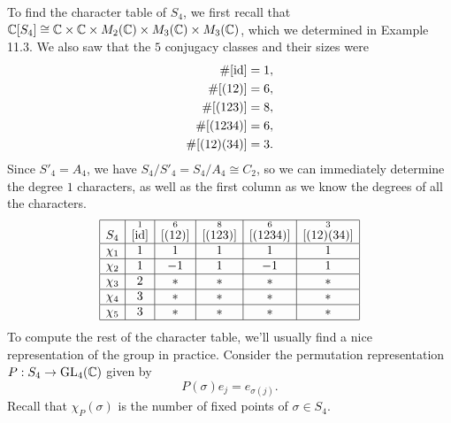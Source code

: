 \begin{exmp}{}
    To find the character table of $S_4$, we first recall that 
    $\mathbb{C}[S_4] \cong \mathbb{C} \times \mathbb{C} \times M_2(\mathbb{C}) \times M_3(\mathbb{C}) \times M_3(\mathbb{C})$, 
    which we determined in Example 11.3. We also saw that the $5$ conjugacy 
    classes and their sizes were 
    \begin{align*} 
        \#[\operatorname{id}] &= 1, \\ 
        \#[(12)] &= 6, \\
        \#[(123)] &= 8, \\
        \#[(1234)] &= 6, \\
        \#[(12)(34)] &= 3. 
    \end{align*}
    Since $S'_4 = A_4$, we have $S_4/S'_4 = S_4/A_4 \cong C_2$, so we can immediately 
    determine the degree $1$ characters, as well as the first column as we 
    know the degrees of all the characters. 
    \begin{align*}
        \begin{array}{|c|c|c|c|c|c|}
            \hline
            S_4    & \overset{1}{[\operatorname{id}]} & \overset{6}{[(12)]} & \overset{8}{[(123)]} & \overset{6}{[(1234)]} & \overset{3}{[(12)(34)]} \\ \hline
            \chi_1 & 1                  & 1                   & 1                    & 1                     & 1                       \\ \hline
            \chi_2 & 1                  & -1                  & 1                    & -1                    & 1                       \\ \hline
            \chi_3 & 2                  & *                   & *                    & *                     & *                       \\ \hline
            \chi_4 & 3                  & *                   & *                    & *                     & *                       \\ \hline
            \chi_5 & 3                  & *                   & *                    & *                     & *                       \\ \hline
        \end{array} 
    \end{align*}
    To compute the rest of the character table, we'll usually find a nice 
    representation of the group in practice. Consider the permutation representation
    $P : S_4 \to \operatorname{GL}_4(\mathbb{C})$ given by 
    \[ P(\sigma)e_j = e_{\sigma(j)}. \] 
    Recall that $\chi_P(\sigma)$ is the number of fixed points of $\sigma \in S_4$. 

\end{exmp}
